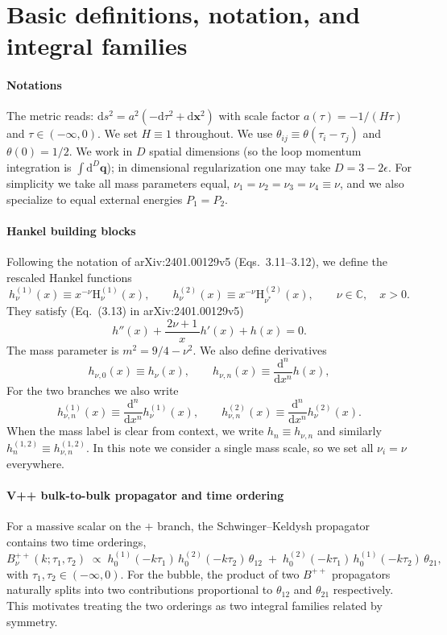 \documentclass[a4paper,12pt]{article}
\newcommand{\FR}[2]{\displaystyle\frac{\,{#1}\,}{#2}}
\def\bge{\begin{equation}}
\def\ede{\end{equation}}
\def\di{{\mathrm{d}}}
\def\mb{\mathbf}
\def\ep{\epsilon}
\begin{document}
\section{Basic definitions, notation, and integral families}
\label{sec:definitions}
\paragraph{Notations} The metric reads: $\di s^2=a^2(-\di\tau^2+\di \mb x^2)$ with scale factor $a(\tau)=-1/(H\tau)$ and $\tau\in(-\infty,0)$. We set $H\equiv 1$ throughout. We use $\theta_{ij}\equiv\theta(\tau_i-\tau_j)$ and $\theta(0)=1/2$. We work in $D$ spatial dimensions (so the loop momentum integration is $\int\di^D\mb q$); in dimensional regularization one may take $D=3-2\ep$. For simplicity we take all mass parameters equal, $\nu_1=\nu_2=\nu_3=\nu_4\equiv\nu$, and we also specialize to equal external energies $P_1=P_2$.

\paragraph{Hankel building blocks} Following the notation of arXiv:2401.00129v5 (Eqs.~3.11--3.12), we define the rescaled Hankel functions
\bge
h_\nu^{(1)}(x) \equiv x^{-\nu}\mathrm H_{
\nu}^{(1)}(x),\qquad h_\nu^{(2)}(x) \equiv x^{-\nu}\mathrm H_{
\nu^*}^{(2)}(x),\qquad 
\nu\in\mathbb C,\quad x>0.
\ede
They satisfy (Eq.~(3.13) in arXiv:2401.00129v5)
\begin{equation}
	\label{eq:hdef}
	h''(x) + \FR{2\nu+1}{x}h'(x) + h(x) = 0.
\end{equation}
The mass parameter is $m^2=9/4-\nu^2$. We also define derivatives
\bge
h_{\nu,0}(x)\equiv h_\nu(x),\qquad h_{\nu,n} (x)  \equiv  \FR{\di^n}{\di x^n}h(x),
\ede
For the two branches we also write
\bge
h^{(1)}_{\nu,n}(x)\equiv \FR{\di^n}{\di x^n}h^{(1)}_\nu(x),\qquad
h^{(2)}_{\nu,n}(x)\equiv \FR{\di^n}{\di x^n}h^{(2)}_\nu(x).
\ede
When the mass label is clear from context, we write $h_n\equiv h_{\nu,n}$ and similarly $h^{(1,2)}_n\equiv h^{(1,2)}_{\nu,n}$.
In this note we consider a single mass scale, so we set all $\nu_i=\nu$ everywhere.

\paragraph{V++ bulk-to-bulk propagator and time ordering} For a massive scalar on the $+$ branch, the Schwinger--Keldysh propagator contains two time orderings,
\bge
B^{++}_\nu(k;\tau_1,\tau_2)\;\propto\;
h_0^{(1)}(-k\tau_1)\,h_0^{(2)}(-k\tau_2)\,\theta_{12}
\;+\;
h_0^{(2)}(-k\tau_1)\,h_0^{(1)}(-k\tau_2)\,\theta_{21},
\ede
with $\tau_1,\tau_2\in(-\infty,0)$. For the bubble, the product of two $B^{++}$ propagators naturally splits into two contributions proportional to $\theta_{12}$ and $\theta_{21}$ respectively. This motivates treating the two orderings as two integral families related by symmetry.
\end{document}
